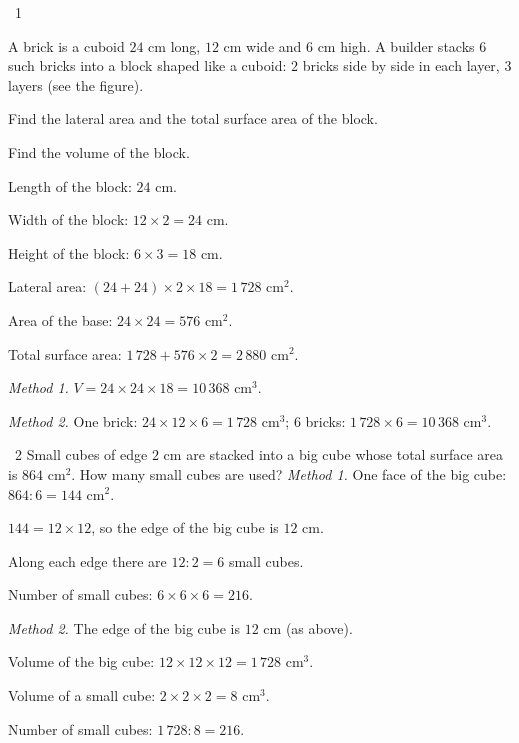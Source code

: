 \begin{exbox}{\ExWord\ 1}
\begin{minipage}[t]{0.6\linewidth}
A brick is a cuboid $24$ cm long, $12$ cm wide and $6$ cm high. A builder stacks $6$ such bricks into a block shaped like a cuboid: $2$ bricks side by side in each layer, $3$ layers (see the figure).\par
{} Find the lateral area and the total surface area of the block.\par
{} Find the volume of the block.
\end{minipage}\hfill
\begin{minipage}[t]{0.36\linewidth}\vspace{0pt}\centering
{}
\end{minipage}
\guide
{} Length of the block: $24$ cm.\par
Width of the block: $12\times2=24$ cm.\par
Height of the block: $6\times3=18$ cm.\par
Lateral area: $(24+24)\times2\times18=1\,728$ cm$^2$.\par
Area of the base: $24\times24=576$ cm$^2$.\par
Total surface area: $1\,728+576\times2=2\,880$ cm$^2$.\par
{} \emph{Method 1.} $V=24\times24\times18=10\,368$ cm$^3$.\par
\emph{Method 2.} One brick: $24\times12\times6=1\,728$ cm$^3$; $6$ bricks: $1\,728\times6=10\,368$ cm$^3$.
\end{exbox}
\gap
\begin{exbox}{\ExWord\ 2}
Small cubes of edge $2$ cm are stacked into a big cube whose total surface area is $864$ cm$^2$. How many small cubes are used?
\guide
\emph{Method 1.} One face of the big cube: $864:6=144$ cm$^2$.\par
$144=12\times12$, so the edge of the big cube is $12$ cm.\par
Along each edge there are $12:2=6$ small cubes.\par
Number of small cubes: $6\times6\times6=216$.\par
\emph{Method 2.} The edge of the big cube is $12$ cm (as above).\par
Volume of the big cube: $12\times12\times12=1\,728$ cm$^3$.\par
Volume of a small cube: $2\times2\times2=8$ cm$^3$.\par
Number of small cubes: $1\,728:8=216$.
\end{exbox}
